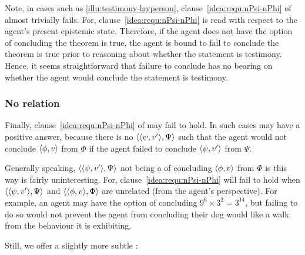 \begin{note}
  Note, in cases such as \autoref{illu:testimony-layperson}, clause~\ref{idea:requ:nPsi-nPhi} of \iRequ{} almost trivially fails.
  For, clause~\ref{idea:requ:nPsi-nPhi} is read with respect to the agent's present epistemic state.
  Therefore, if the agent does not have the option of concluding the theorem is true, the agent is bound to fail to conclude the theorem is true prior to reasoning about whether the statement is testimony.
  Hence, it seems straightforward that failure to conclude has no bearing on whether the agent would conclude the statement is testimony.
\end{note}

\subsubsection{No relation}

\begin{note}
  Finally, clause~\ref{idea:requ:nPsi-nPhi} of \iRequ{} may fail to hold.
  In such cases \qzS{} may have a positive answer, because there is no \(\langle \langle \psi, v' \rangle, \Psi \rangle\) such that the agent would not conclude \(\langle \phi, v \rangle\) from \(\Phi\) if the agent failed to conclude \(\langle \psi, v' \rangle\) from \(\Psi\).

  Generally speaking, \(\langle \langle \psi, v' \rangle, \Psi \rangle\) not being a \requ{} of concluding \(\langle \phi, v \rangle\) from \(\Phi\) is this way is fairly uninteresting.
  For, clause~\ref{idea:requ:nPsi-nPhi} will fail to hold when \(\langle \langle \psi, v' \rangle, \Psi \rangle\) and \(\langle \langle \phi, v \rangle, \Phi \rangle\) are unrelated (from the agent's perspective).
  For example, an agent may have the option of concluding \(9^{6} \times 3^{2} = 3^{14}\), but failing to do so would not prevent the agent from concluding their dog would like a walk from the behaviour it is exhibiting.

  Still, we offer a slightly more subtle :
\end{note}

